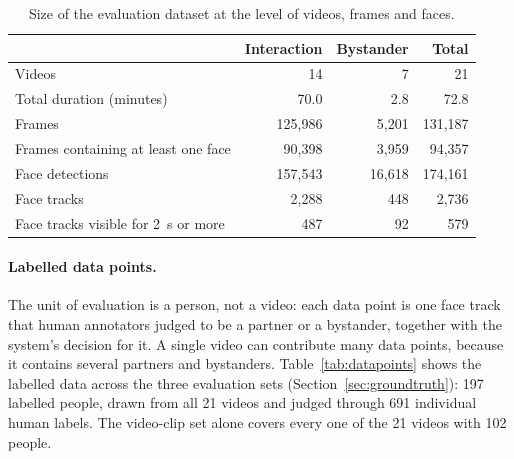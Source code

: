 \begin{table}[htbp]
\begin{singlespace}
\centering
\caption{Size of the evaluation dataset at the level of videos, frames and faces.}
\label{tab:dataset}
\renewcommand{\arraystretch}{1.3}
\begin{tabular}{@{}lrrr@{}}
\toprule
 & \textbf{Interaction} & \textbf{Bystander} & \textbf{Total} \\
\midrule
Videos                              & 14         & 7        & 21 \\
Total duration (minutes)            & 70.0       & 2.8      & 72.8 \\
Frames                              & 125{,}986  & 5{,}201  & 131{,}187 \\
Frames containing at least one face & 90{,}398   & 3{,}959  & 94{,}357 \\
Face detections                     & 157{,}543  & 16{,}618 & 174{,}161 \\
Face tracks                         & 2{,}288    & 448      & 2{,}736 \\
Face tracks visible for 2~s or more & 487        & 92       & 579 \\
\bottomrule
\end{tabular}
\end{singlespace}
\end{table}

\paragraph{Labelled data points.}
The unit of evaluation is a person, not a video: each data point is one face track that
human annotators judged to be a partner or a bystander, together with the system's
decision for it. A single video can contribute many data points, because it contains
several partners and bystanders. Table~\ref{tab:datapoints} shows the labelled data across
the three evaluation sets (Section~\ref{sec:groundtruth}): 197 labelled people, drawn from
all 21 videos and judged through 691 individual human labels. The video-clip set alone
covers every one of the 21 videos with 102 people.

